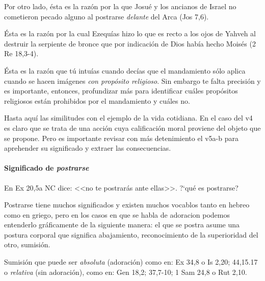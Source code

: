 \documentclass{article}
\begin{document}
Por otro lado, \'esta es la raz\'on por la que Josu\'e y los ancianos de Israel no cometieron pecado alguno al postrarse \emph{delante} del Arca (Jos 7,6).

\'Esta es la raz\'on por la cual Ezequ\'{i}as hizo lo que es recto a los ojos de Yahveh al destruir la serpiente de bronce que por indicaci\'on de Dios hab\'{i}a hecho Mois\'es (2 Re 18,3-4).

\'Esta es la raz\'on que t\'u intu\'{i}as cuando dec\'{i}as que el mandamiento s\'olo aplica cuando se hacen im\'agenes \emph{con prop\'osito religioso}. Sin embargo te falta precisi\'on y es importante, entonces, profundizar m\'as para identificar cu\'ales prop\'ositos religiosos est\'an prohibidos por el mandamiento y cu\'ales no.

Hasta aqu\'{i} las similitudes con el ejemplo de la vida cotidiana. En el caso del v4 es claro que se trata de una acci\'on cuya calificaci\'on moral proviene del objeto que se propone. Pero es importante revisar con m\'as detenimiento el v5a-b para aprehender su significado y extraer las consecuencias.

\paragraph{Significado de \emph{postrarse}}

En Ex 20,5a NC dice: <<no te postrar\'as ante ellas>>. ?`qu\'e es postrarse?

Postrarse tiene muchos significados y existen muchos vocablos tanto en hebreo como en griego, pero en los casos en que se habla de adoracion podemos entenderlo gr\'aficamente de la siguiente manera: el que se postra asume una postura corporal que significa abajamiento, reconocimiento de la superioridad del otro, sumisi\'on.

Sumisi\'on que puede ser \emph{absoluta} (adoraci\'on) como en: Ex 34,8 o Is 2,20; 44,15.17 o \emph{relativa} (sin adoraci\'on), como en: Gen 18,2; 37,7-10; 1 Sam 24,8 o Rut 2,10.
\end{document}

